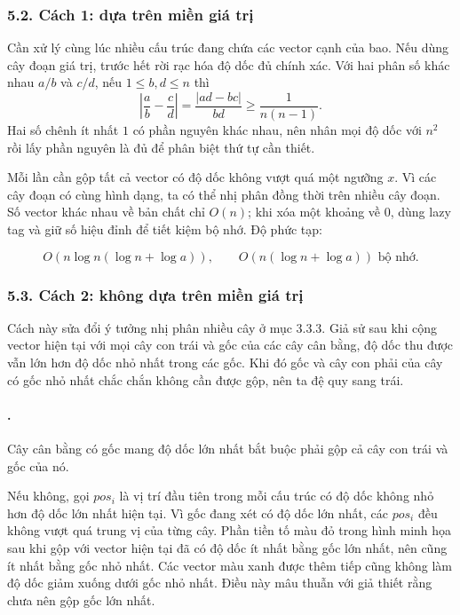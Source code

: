 \documentclass[11pt]{article}
\begin{document}
\subsubsection*{5.2. Cách 1: dựa trên miền giá trị}

Cần xử lý cùng lúc nhiều cấu trúc đang chứa các vector cạnh của bao. Nếu dùng
cây đoạn giá trị, trước hết rời rạc hóa độ dốc đủ chính xác. Với hai phân số
khác nhau \(a/b\) và \(c/d\), nếu \(1\le b,d\le n\) thì
\[
  \left|\frac{a}{b}-\frac{c}{d}\right|
  =\frac{|ad-bc|}{bd}\ge \frac{1}{n(n-1)}.
\]
Hai số chênh ít nhất \(1\) có phần nguyên khác nhau, nên nhân mọi độ dốc với
\(n^2\) rồi lấy phần nguyên là đủ để phân biệt thứ tự cần thiết.

Mỗi lần cần gộp tất cả vector có độ dốc không vượt quá một ngưỡng \(x\). Vì các
cây đoạn có cùng hình dạng, ta có thể nhị phân đồng thời trên nhiều cây đoạn.
Số vector khác nhau về bản chất chỉ \(O(n)\); khi xóa một khoảng về \(0\), dùng
lazy tag và giữ số hiệu đỉnh để tiết kiệm bộ nhớ. Độ phức tạp:

\begin{center}
\end{center}

\[
  O(n\log n(\log n+\log a)),\qquad
  O(n(\log n+\log a))\text{ bộ nhớ}.
\]

\subsubsection*{5.3. Cách 2: không dựa trên miền giá trị}

Cách này sửa đổi ý tưởng nhị phân nhiều cây ở mục 3.3.3. Giả sử sau khi cộng
vector hiện tại với mọi cây con trái và gốc của các cây cân bằng, độ dốc thu
được vẫn lớn hơn độ dốc nhỏ nhất trong các gốc. Khi đó gốc và cây con phải của
cây có gốc nhỏ nhất chắc chắn không cần được gộp, nên ta đệ quy sang trái.

\paragraph{.}
Cây cân bằng có gốc mang độ dốc lớn nhất bắt buộc phải gộp cả cây con trái và
gốc của nó.

Nếu không, gọi \(pos_i\) là vị trí đầu tiên trong mỗi cấu trúc có độ dốc không
nhỏ hơn độ dốc lớn nhất hiện tại. Vì gốc đang xét có độ dốc lớn nhất, các
\(pos_i\) đều không vượt quá trung vị của từng cây. Phần tiền tố màu đỏ trong
hình minh họa sau khi gộp với vector hiện tại đã có độ dốc ít nhất bằng gốc lớn
nhất, nên cũng ít nhất bằng gốc nhỏ nhất. Các vector màu xanh được thêm tiếp
cũng không làm độ dốc giảm xuống dưới gốc nhỏ nhất. Điều này mâu thuẫn với giả
thiết rằng chưa nên gộp gốc lớn nhất.
\end{document}
